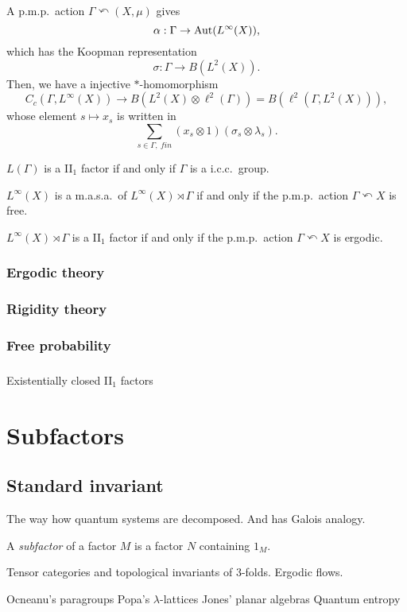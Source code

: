 \documentclass{../../large}
\begin{document}
\section{}
\begin{prb}
A p.m.p.~action $\Gamma\curvearrowleft(X,\mu)$ gives
\[\alpha:\Gamma\to\operatorname{Aut}(L^\infty(X)),\]
which has the Koopman representation
\[\sigma:\Gamma\to B(L^2(X)).\]
Then, we have a injective $*$-homomorphism
\[C_c(\Gamma,L^\infty(X))\to B(L^2(X)\otimes\ell^2(\Gamma))=B(\ell^2(\Gamma,L^2(X))),\]
whose element $s\mapsto x_s$ is written in
\[\sum_{s\in\Gamma,\ fin}(x_s\otimes1)(\sigma_s\otimes\lambda_s).\]

\begin{parts}
\item $L(\Gamma)$ is a II$_1$ factor if and only if $\Gamma$ is a i.c.c.~group.
\item $L^\infty(X)$ is a m.a.s.a.~of $L^\infty(X)\rtimes\Gamma$ if and only if the p.m.p.~action $\Gamma\curvearrowleft X$ is free.
\item $L^\infty(X)\rtimes\Gamma$ is a II$_1$ factor if and only if the p.m.p.~action $\Gamma\curvearrowleft X$ is ergodic.
\end{parts}
\end{prb}


\section{Ergodic theory}
\section{Rigidity theory}
\section{Free probability}
\section{}
Existentially closed II$_1$ factors






\part{Subfactors}


\chapter{Standard invariant}

The way how quantum systems are decomposed.
And has Galois analogy.

\begin{prb}
A \emph{subfactor} of a factor $M$ is a factor $N$ containing $1_M$.
\end{prb}

Tensor categories and topological invariants of 3-folds.
Ergodic flows.


Ocneanu's paragroups
Popa's $\lambda$-lattices
Jones' planar algebras
Quantum entropy
\end{document}
